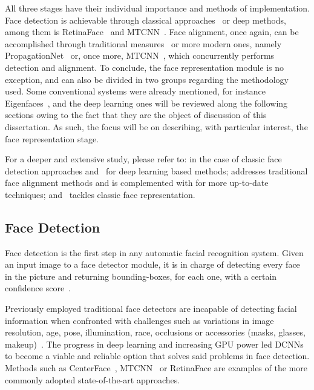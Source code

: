 \documentclass[class=report, crop=false, a4paper, 12pt]{standalone}
\begin{document}
\par All three stages have their individual importance and methods of implementation. Face detection is achievable through classical approaches~\autocite{violaRapidObjectDetection2001, brubakerDesignCascadesBoosted2008} or deep methods, among them is RetinaFace~\autocite{dengRetinaFaceSinglestageDense2019} and MTCNN~\autocite{zhangJointFaceDetection2016a}. Face alignment, once again, can be accomplished through traditional measures~\autocite{cootesViewbasedActiveAppearance2002, martinezLocalEvidenceAggregation2013} or more modern ones, namely PropagationNet~\autocite{huangPropagationNetPropagatePoints2020} or, once more, MTCNN~\autocite{zhangJointFaceDetection2016a}, which concurrently performs detection and alignment. To conclude, the face representation module is no exception, and can also be divided in two groups regarding the methodology used. Some conventional systems were already mentioned, for instance Eigenfaces~\autocite{p.n.belhumeurEigenfacesVsFisherfaces1997,turkEigenfacesRecognition1991}, and the deep learning ones will be reviewed along the following sections owing to the fact that they are the object of discussion of this dissertation. As such, the focus will be on describing, with particular interest, the face representation stage. 
\par For a deeper and extensive study, please refer to: \autocite{zafeiriouSurveyFaceDetection2015} in the case of classic face detection approaches and~\autocite{minaeeGoingDeeperFace2021} for deep learning based methods; \autocite{wangFacialFeaturePoint2018} addresses traditional face alignment methods and is complemented with \autocite{duElementsEndtoendDeep2022} for more up-to-date techniques; and~\autocite{learned-millerLabeledFacesWild2016} tackles classic face representation.

\subsection{Face Detection}\label{sec:face_detect}
\par Face detection is the first step in any automatic facial recognition system. Given an input image to a face detector module, it is in charge of detecting every face in the picture and returning bounding-boxes, for each one, with a certain confidence score~\autocite{duElementsEndtoendDeep2022,ranjanDeepLearningUnderstanding2018}.

\par Previously employed traditional face detectors are incapable of detecting facial information when confronted with challenges such as variations in image resolution, age, pose, illumination, race, occlusions or accessories (masks, glasses, makeup)~\autocite{duElementsEndtoendDeep2022,ranjanDeepLearningUnderstanding2018}. The progress in deep learning and increasing GPU power led \gls{DCNNs} to become a viable and reliable option that solves said problems in face detection. Methods such as CenterFace~\autocite{xuCenterFaceJointFace2019}, MTCNN~\autocite{zhangJointFaceDetection2016a} or RetinaFace\autocite{dengRetinaFaceSinglestageDense2019} are examples of the more commonly adopted state-of-the-art approaches.
\end{document}
